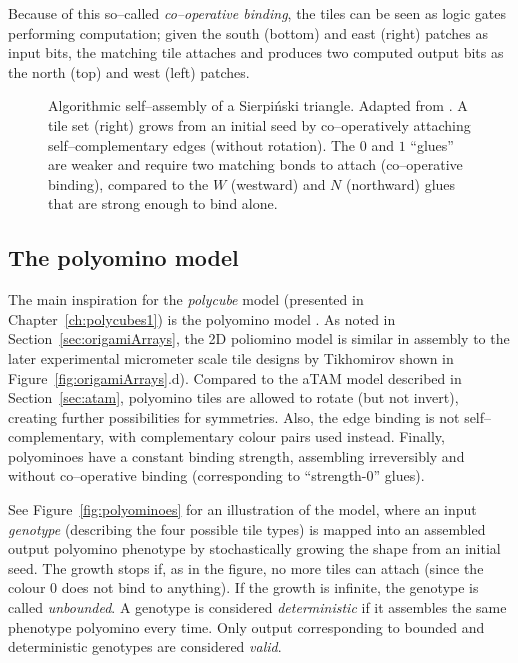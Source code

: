 Because of this so--called \emph{co--operative binding}, the tiles can be seen as logic gates performing computation; given the south (bottom) and east (right) patches as input bits, the matching tile attaches and produces two computed output bits as the north (top) and west (left) patches.



\begin{figure}[h]
  \centering
  \caption{Algorithmic self--assembly of a Sierpiński triangle. Adapted from \cite{doty2017}. A tile set (right) grows from an initial seed by co--operatively attaching self--complementary edges (without rotation). The \(0\) and \(1\) ``glues'' are weaker and require two matching bonds to attach (co--operative binding), compared to the \(W\) (westward) and \(N\) (northward) glues that are strong enough to bind alone.}
  \label{fig:atam}
\end{figure}

\subsection{The polyomino model}\label{sec:polyomino}


The main inspiration for the \emph{polycube} model (presented in Chapter~\ref{ch:polycubes1}) is the polyomino model \cite{ahnert2010self, johnston2011evolutionary, greenbury2014tractable}. As noted in Section~\ref{sec:origamiArrays}, the 2D poliomino model is similar in assembly to the later experimental micrometer scale tile designs by Tikhomirov \cite{tikhomirov2017programmable} shown in Figure~\ref{fig:origamiArrays}.d). Compared to the aTAM model described in Section~\ref{sec:atam}, polyomino tiles are allowed to rotate (but not invert), creating further possibilities for symmetries. Also, the edge binding is not self--complementary, with complementary colour pairs used instead. Finally, polyominoes have a constant binding strength, assembling irreversibly and without co--operative binding (corresponding to ``strength-0'' glues).

See Figure~\ref{fig:polyominoes} for an illustration of the model, where an input \emph{genotype} (describing the four possible tile types) is mapped into an assembled output polyomino phenotype by stochastically growing the shape from an initial seed. The growth stops if, as in the figure, no more tiles can attach (since the colour \(0\) does not bind to anything). If the growth is infinite, the genotype is called \emph{unbounded}. A genotype is considered \emph{deterministic} if it assembles the same phenotype polyomino every time. Only output corresponding to bounded and deterministic genotypes are considered \emph{valid}.

